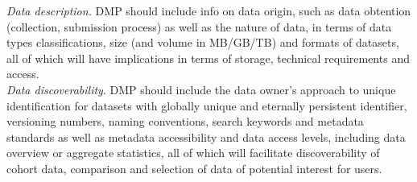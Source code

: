 \documentclass{article}
\begin{document}

\textit{Data description.}
DMP should include info on data origin, such as data obtention (collection, submission process) as well as the nature of data, in terms of data types classifications, size (and volume in MB/GB/TB) and formats of datasets, all of which will have implications in terms of storage, technical requirements and access. \\


\textit{Data discoverability}. DMP should include the data owner's approach to unique identification for datasets with globally unique and eternally persistent identifier, versioning numbers, naming conventions, search keywords and metadata standards as well as metadata accessibility and data access levels, including data overview or aggregate statistics, all of which will facilitate discoverability of cohort data, comparison and selection of data of potential interest for users. \\


\end{document}
